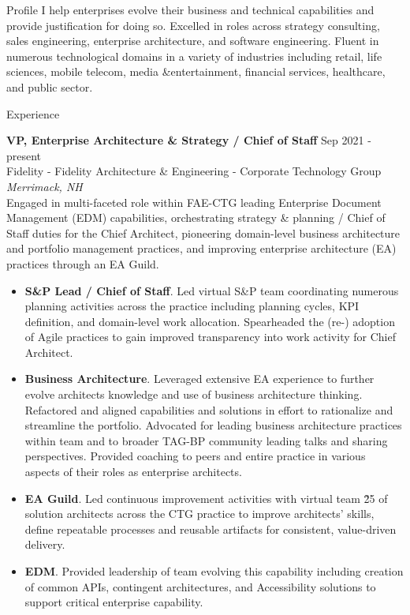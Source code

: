 \documentclass{resume} %
\begin{document}
\begin{rSection}{Profile}
I help enterprises evolve their business and technical capabilities and provide justification for doing so. Excelled in roles across strategy consulting, sales engineering, enterprise architecture, and software engineering. Fluent in numerous technological domains in a variety of industries including retail, life sciences, mobile telecom, media \&entertainment, financial services, healthcare, and public sector.

\end{rSection}

\begin{rSection}{Experience}

\textbf{VP, Enterprise Architecture \& Strategy / Chief of Staff} \hfill Sep 2021 - present\\
Fidelity - Fidelity Architecture \& Engineering - Corporate Technology Group \hfill \textit{Merrimack, NH}\\
Engaged in multi-faceted role within FAE-CTG leading Enterprise Document Management (EDM) capabilities, orchestrating strategy \& planning / Chief of Staff duties for the Chief Architect, pioneering domain-level business architecture and portfolio management practices, and improving enterprise architecture (EA) practices through an EA Guild.

\begin{itemize}
   \itemsep -3pt {} 
   \item \textbf{S\&P Lead / Chief of Staff}. Led virtual S\&P team coordinating numerous planning activities across the practice including planning cycles, KPI definition, and domain-level work allocation. Spearheaded the (re-) adoption of Agile practices to gain improved transparency into work activity for Chief Architect.
   \item \textbf{Business Architecture}. Leveraged extensive EA experience to further evolve architects knowledge and use of business architecture thinking. Refactored and aligned capabilities and solutions in effort to rationalize and streamline the portfolio. Advocated for leading business architecture practices within team and to broader TAG-BP community leading talks and sharing perspectives. Provided coaching to peers and entire practice in various aspects of their roles as enterprise architects.
   \item \textbf{EA Guild}. Led continuous improvement activities with virtual team \~25 of solution architects across the CTG practice to improve architects' skills, define repeatable processes and reusable artifacts for consistent, value-driven delivery.
   \item \textbf{EDM}. Provided leadership of team evolving this capability including creation of common APIs, contingent architectures, and Accessibility solutions to support critical enterprise capability. 
 \end{itemize}


\end{rSection}
\end{document}
